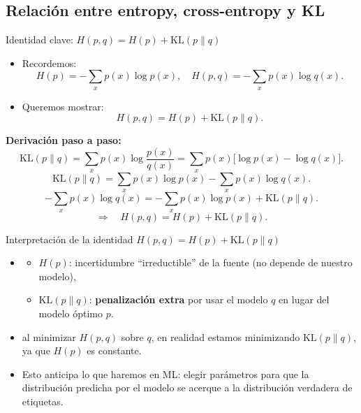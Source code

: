 \subsection{Relación entre entropy, cross-entropy y KL}

\begin{frame}{Identidad clave: \(H(p,q) = H(p) + \mathrm{KL}(p\|q)\)}
\begin{itemize}
  \item Recordemos:
  \[
    H(p) = -\sum_x p(x)\log p(x),\quad
    H(p,q) = -\sum_x p(x)\log q(x).
  \]
  \item Queremos mostrar:
  \[
    H(p,q) = H(p) + \mathrm{KL}(p\|q).
  \]
\end{itemize}

\vspace{0.5em}
\textbf{Derivación paso a paso:}
\[
  \mathrm{KL}(p\|q)
  = \sum_x p(x)\log\frac{p(x)}{q(x)}
  = \sum_x p(x)\big[\log p(x) - \log q(x)\big].
\]
\[
  \mathrm{KL}(p\|q)
  = \sum_x p(x)\log p(x) - \sum_x p(x)\log q(x).
\]
\[
  -\sum_x p(x)\log q(x)
  = -\sum_x p(x)\log p(x) + \mathrm{KL}(p\|q).
\]
\[
  \Rightarrow\quad H(p,q) = H(p) + \mathrm{KL}(p\|q).
\]
\end{frame}

\begin{frame}{Interpretación de la identidad \(H(p,q)=H(p)+\mathrm{KL}(p\|q)\)}
\begin{itemize}
  \item {}
  \begin{itemize}
    \item \(H(p)\): incertidumbre “irreductible” de la fuente (no depende de nuestro modelo),
    \item \(\mathrm{KL}(p\|q)\): \textbf{penalización extra} por usar el modelo \(q\) en lugar del modelo óptimo \(p\).
  \end{itemize}
  \item {} al minimizar \(H(p,q)\) sobre \(q\), en realidad estamos minimizando \(\mathrm{KL}(p\|q)\), ya que \(H(p)\) es constante.
  \item Esto anticipa lo que haremos en ML: elegir parámetros para que la distribución predicha por el modelo se acerque a la distribución verdadera de etiquetas.
\end{itemize}
\end{frame}

